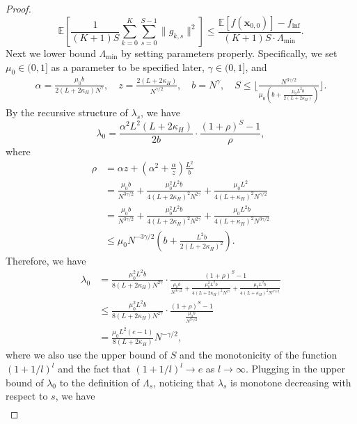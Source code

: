 \documentclass{article}
\newcommand{\bx}{\boldsymbol{x}}
\theoremstyle{plain}
\theoremstyle{definition}
\theoremstyle{remark}
\begin{document}
\begin{proof}
\begin{equation}
     \mathbb{E}\left[\frac{1}{(K+1)S}\sum_{k=0}^K\sum_{s=0}^{S-1}\|g_{k,s}\|^2\right] \leq \frac{\mathbb{E}[f(\bx_{0,0})] - f_{\inf}}{(K+1)S \cdot \Lambda_{\min}}.
\end{equation}
Next we lower bound $\Lambda_{\min}$ by setting parameters properly. Specifically, we set $\mu_0\in(0,1]$ as a parameter to be specified later, $\gamma\in(0,1]$, and
\begin{align*}
    \alpha = \frac{\mu_0 b}{2(L+2\kappa_H)N^\gamma},\quad z = \frac{2(L+2\kappa_H)}{N^{\gamma/2}}, \quad b = N^{\gamma},\quad S \leq \bigg\lfloor\frac{N^{3\gamma/2}}{\mu_0(b+\frac{\mu_0L^2b}{2(L+2\kappa_H)})}\bigg\rfloor.
\end{align*}
By the recursive structure of $\lambda_s$, we have
\begin{equation*}
    \lambda_0=\frac{\alpha^2 L^2(L+2\kappa_H)}{2b}\cdot \frac{(1+\rho)^S-1}{\rho},
\end{equation*}
where
\begin{align*}
    \rho & = \alpha z + \left(\alpha^2 + \frac{\alpha}{ z}\right)\frac{ L^2}{b} \\
    & = \frac{\mu_0 b}{N^{3\gamma/2}} + \frac{\mu_0^2L^2 b}{4(L+2\kappa_H)^2N^{2\gamma}}+\frac{\mu_0L^2}{4(L+\kappa_H)^2N^{\gamma/2}}\\
    & = \frac{\mu_0 b}{N^{3\gamma/2}} + \frac{\mu_0^2L^2 b}{4(L+2\kappa_H)^2N^{2\gamma}}+\frac{\mu_0L^2b}{4(L+\kappa_H)^2N^{3\gamma/2}} \\
    & \leq \mu_0 N^{-3\gamma/2} \left( b + \frac{L^2b}{2(L+2\kappa_H)^2}\right).
\end{align*}
Therefore, we have
\begin{align*}
    \lambda_0 & =  \frac{\mu_0^2 L^2 b}{8(L+2\kappa_H)N^{2\gamma}} \cdot \frac{(1+\rho)^S-1}{\frac{\mu_0 b}{N^{3\gamma/2}} + \frac{\mu_0^2L^2 b}{4(L+2\kappa_H)^2N^{2\gamma}}+\frac{\mu_0L^2b}{4(L+\kappa_H)^2N^{3\gamma/2}}}\\
    & \leq \frac{\mu_0^2 L^2 b}{8(L+2\kappa_H)N^{2\gamma}} \cdot \frac{(1+\rho)^S-1}{\frac{\mu_0 b}{N^{3\gamma/2}}}\\
    & = \frac{\mu_0 L^2(e-1)}{8(L+2\kappa_H) }N^{-\gamma/2},
\end{align*}
where we also use the upper bound of $S$ and the monotonicity of the function $(1+1/l)^l$ and the fact that $(1+1/l)^l\rightarrow e$ as $l\rightarrow\infty$.
Plugging in the upper bound of $\lambda_0$ to the definition of $\Lambda_s$, noticing that $\lambda_s$ is monotone decreasing with respect to $s$, we have
\begin{align*}

\end{align*}
\end{proof}
\end{document}
